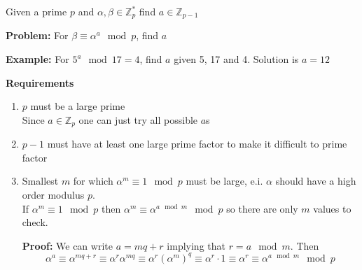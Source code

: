
Given a prime $p$ and $\alpha, \beta \in \mathbb{Z}_p^*$ find $a \in \mathbb{Z}_{p-1}$

\textbf{Problem:} For $\beta \equiv \alpha^a \mod p$, find $a$

\textbf{Example:} For $5^a \mod 17 = 4$, find $a$ given 5, 17 and 4. Solution is $a = 12$

\textbf{Requirements}
\begin{enumerate}
\item $p$ must be a large prime\\
  Since $a \in \mathbb{Z}_p$ one can just try all possible $a$s

\item $p - 1$ must have at least one large prime factor to make it
  difficult to prime factor

\item Smallest $m$ for which $\alpha^m \equiv 1 \mod p$ must be large,
  e.i. $\alpha$ should have a high order modulus $p$. \\
  If $\alpha^m
  \equiv 1 \mod p$ then $\alpha^m \equiv \alpha^{a \mod m} \mod p$ so
  there are only $m$ values to check.

  \textbf{Proof:} We can write $a = mq + r$ implying that $r = a \mod m$. Then
  \[ \alpha^a \equiv \alpha^{mq + r} \equiv \alpha^r\alpha^{mq} \equiv
  \alpha^r(\alpha^m)^q \equiv \alpha^r\cdot 1 \equiv \alpha^r \equiv
  \alpha^{a \mod m} \mod p\]
\end{enumerate}
